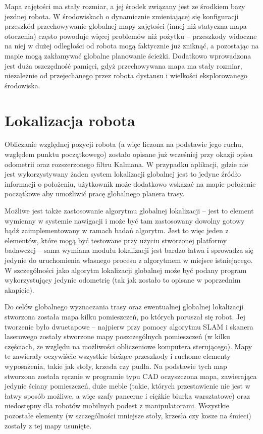 Mapa zajętości ma stały rozmiar, a jej środek związany jest ze środkiem bazy
jezdnej robota. W środowiskach o dynamicznie zmieniającej się konfiguracji
przeszkód przechowywanie globalnej mapy zajętości (innej niż statyczna mapa
otoczenia) często powoduje więcej problemów niż pożytku -- przeszkody widoczne
na niej w dużej odległości od robota mogą faktycznie już zniknąć, a pozostając
na mapie mogą zakłamywać globalne planowanie ścieżki. Dodatkowo wprowadzona jest
duża oszczędność pamięci, gdyż przechowywana mapa ma stały rozmiar, niezależnie
od przejechanego przez robota dystansu i wielkości eksplorowanego środowiska.

\section{Lokalizacja robota}

Obliczanie względnej pozycji robota (a więc liczona na podstawie jego ruchu, względem
punktu początkowego) zostało opisane już wcześniej przy okazji opisu odometrii
oraz rozszerzonego filtru Kalmana. W przypadku aplikacji, gdzie nie jest wykorzystywany
żaden system lokalizacji globalnej jest to jedyne źródło informacji o położeniu,
użytkownik może dodatkowo wskazać na mapie położenie początkowe aby umożliwić pracę
globalnego planera trasy.

Możliwe jest także zastosowanie algorytmu globalnej lokalizacji -- jest to element
wymienny w systemie nawigacji i może być tam zastosowany dowolny gotowy bądź zaimplementowany
w ramach badań algorytm. Jest to więc jeden z elementów, które mogą być testowane
przy użyciu stworzonej platformy badawczej -- sama wymiana modułu lokalizacji jest
bardzo łatwa i sprowadza się jedynie do uruchomienia własnego procesu z algorytmem
w miejsce istniejącego. W szczególności jako algorytm lokalizacji globalnej może być
podany program wykorzystujący jedynie odometrię (tak jak zostało to opisane w poprzednim
akapicie).

Do celów globalnego wyznaczania trasy oraz ewentualnej globalnej lokalizacji stworzona
została mapa kilku pomieszczeń, po których poruszał się robot. Jej tworzenie było
dwuetapowe -- najpierw przy pomocy algorytmu SLAM i skanera laserowego zostały
stworzone mapy poszczególnych pomieszczeń (w kilku częściach, ze względu na możliwości
obliczeniowe komputera sterującego). Mapy te zawierały oczywiście wszystkie bieżące
przeszkody i ruchome elementy wyposażenia, takie jak stoły, krzesła czy pudła.
Na podstawie tych map stworzona została ręcznie w programie typu CAD oczyszczona
mapa, zawierająca jedynie ściany pomieszczeń, duże meble (takie, których przestawienie
nie jest w łatwy sposób możliwe, a więc szafy pancerne i ciężkie biurka warsztatowe)
oraz niedostępny dla robotów mobilnych podest z manipulatorami. Wszystkie pozostałe
elementy (w szczególności mniejsze stoły, krzesła czy kosze na śmieci) zostały z tej
mapy usunięte.

